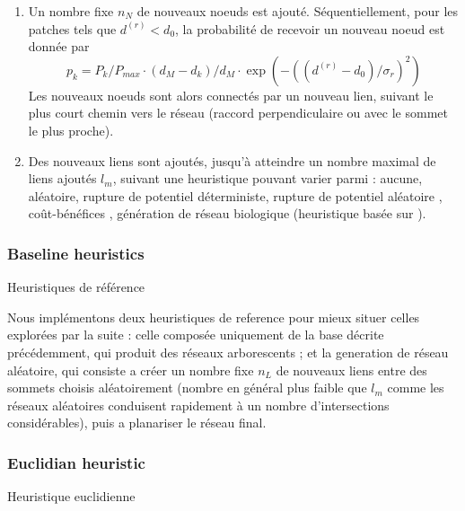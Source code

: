 \begin{enumerate}
	\item Un nombre fixe $n_N$ de nouveaux noeuds est ajouté. Séquentiellement, pour les patches tels que $d^{(r)} < d_0$, la probabilité de recevoir un nouveau noeud est donnée par
\[
p_k = P_k/P_{max} \cdot (d_M - d_k)/d_M \cdot \exp\left(-((d^{(r)} - d_0)/\sigma_r)^2\right)
\]%
Les nouveaux noeuds sont alors connectés par un nouveau lien, suivant le plus court chemin vers le réseau (raccord perpendiculaire ou avec le sommet le plus proche).
	\item Des nouveaux liens sont ajoutés, jusqu'à atteindre un nombre maximal de liens ajoutés $l_{m}$, suivant une heuristique pouvant varier parmi :  aucune, aléatoire, rupture de potentiel déterministe, rupture de potentiel aléatoire \cite{schmitt2014modelisation}, coût-bénéfices \cite{louf2013emergence}, génération de réseau biologique (heuristique basée sur \cite{tero2010rules}).
\end{enumerate}




\subsubsection{Baseline heuristics}{Heuristiques de référence}

Nous implémentons deux heuristiques de reference pour mieux situer celles explorées par la suite : celle composée uniquement de la base décrite précédemment, qui produit des réseaux arborescents ; et la generation de réseau aléatoire, qui consiste a créer un nombre fixe $n_L$ de nouveaux liens entre des sommets choisis aléatoirement (nombre en général plus faible que $l_m$ comme les réseaux aléatoires conduisent rapidement à un nombre d'intersections considérables), puis a planariser le réseau final.



\subsubsection{Euclidian heuristic}{Heuristique euclidienne}



